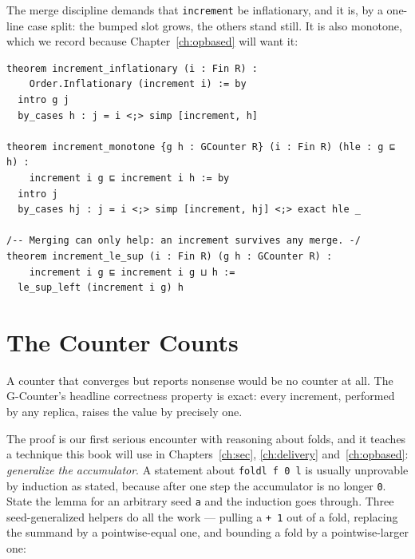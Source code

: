 \documentclass[12pt, a4paper, openright]{book}
\theoremstyle{thmstyle}
\theoremstyle{defstyle}
\newcommand{\lc}[1]{\texttt{#1}}
\begin{document}
The merge discipline demands that \lc{increment} be inflationary, and it
is, by a one-line case split: the bumped slot grows, the others stand
still. It is also monotone, which we record because
Chapter~\ref{ch:opbased} will want it:

\begin{verbatim}
theorem increment_inflationary (i : Fin R) :
    Order.Inflationary (increment i) := by
  intro g j
  by_cases h : j = i <;> simp [increment, h]

theorem increment_monotone {g h : GCounter R} (i : Fin R) (hle : g ⊑ h) :
    increment i g ⊑ increment i h := by
  intro j
  by_cases hj : j = i <;> simp [increment, hj] <;> exact hle _

/-- Merging can only help: an increment survives any merge. -/
theorem increment_le_sup (i : Fin R) (g h : GCounter R) :
    increment i g ⊑ increment i g ⊔ h :=
  le_sup_left (increment i g) h
\end{verbatim}

\section{The Counter Counts}

A counter that converges but reports nonsense would be no counter at
all. The G-Counter's headline correctness property is exact: every
increment, performed by any replica, raises the value by precisely one.

The proof is our first serious encounter with reasoning about folds, and
it teaches a technique this book will use in Chapters~\ref{ch:sec},
\ref{ch:delivery} and~\ref{ch:opbased}: \emph{generalize the
accumulator}. A statement about \lc{foldl f 0 l} is usually unprovable
by induction as stated, because after one step the accumulator is no
longer \lc{0}. State the lemma for an arbitrary seed \lc{a} and the
induction goes through. Three seed-generalized helpers do all the work
--- pulling a \lc{+ 1} out of a fold, replacing the summand by a
pointwise-equal one, and bounding a fold by a pointwise-larger one:
\end{document}
